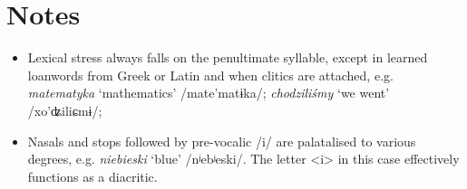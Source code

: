 \section*{Notes}

\begin{itemize}
    \item Lexical stress always falls on the penultimate syllable, except in learned loanwords from Greek or Latin and when clitics are attached, e.g. \textit{matematyka} `mathematics' /mate'matɨka/; \textit{chodziliśmy} `we went' /xo'ʥiliɕmɨ/;
    \item Nasals and stops followed by pre-vocalic /i/ are palatalised to various degrees, e.g. \textit{niebieski} `blue' /nʲebʲeski/. The letter <i> in this case effectively functions as a diacritic.
\end{itemize}
